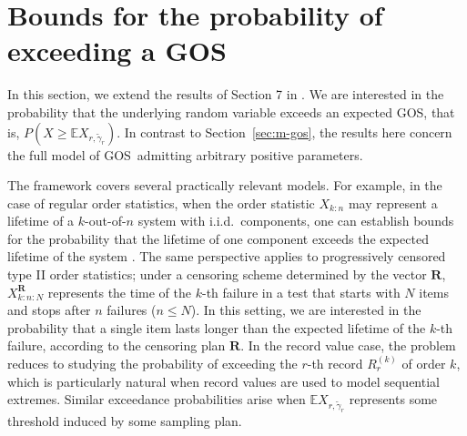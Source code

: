 \documentclass [11pt]{article}
\newcommand{\gos}{GOS}
\begin{document}
\section{Bounds for the probability of exceeding a \gos}
In this section, we extend the results of Section 7 in \cite{ALO-JAP}. We are interested in the probability that the underlying random variable exceeds an expected \gos, that is, $P(X\geq \mathbb E X_{r,\tilde{\gamma}_r})$. In contrast to Section~\ref{sec:m-gos}, the results here concern the full model of \gos\  admitting arbitrary positive parameters.

The framework covers several practically relevant models. For example, in the case of regular order statistics, when the order statistic $X_{k:n}$ may represent a lifetime of a $k$-out-of-$n$ system with i.i.d.\ components, one can establish bounds for the probability that the lifetime of one component exceeds the expected lifetime of the system \cite{ALO-JAP}. %
The same perspective applies to progressively censored type II order statistics; under a censoring scheme determined by the vector $\mathbf R$, $X_{k:n:N}^{\mathbf R}$ represents the time of the $k$-th failure in a test that starts with $N$ items and stops after $n$ failures ($n\leq N$). In this setting, we are interested in the probability that a single item lasts longer than the expected lifetime of the $k$-th failure, according to the censoring plan $\mathbf R$. In the record value case, the problem reduces to studying the probability of exceeding the $r$-th record $R_r^{(k)}$ of order $k$, which is particularly natural when record values are used to model sequential extremes. Similar exceedance probabilities arise when $\mathbb E X_{r,\tilde{\gamma}_r}$ represents some threshold induced by some sampling plan.
\end{document}
